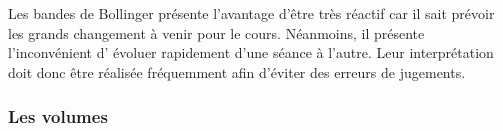 Les bandes de Bollinger présente l'avantage d'être très réactif car il sait prévoir les grands changement à venir pour le cours. Néanmoins, il présente l'inconvénient d' évoluer rapidement d'une séance à l'autre. Leur interprétation doit donc être réalisée fréquemment afin d'éviter des erreurs de jugements.  

\subsubsection{Les volumes}


